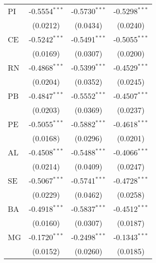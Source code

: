 \begin{tabular}{lccc}
   PI                              & -0.5554$^{***}$              & -0.5730$^{***}$        & -0.5298$^{***}$\\   
                                   & (0.0212)                     & (0.0434)               & (0.0240)\\   
   CE                              & -0.5242$^{***}$              & -0.5491$^{***}$        & -0.5055$^{***}$\\   
                                   & (0.0169)                     & (0.0307)               & (0.0200)\\   
   RN                              & -0.4868$^{***}$              & -0.5399$^{***}$        & -0.4529$^{***}$\\   
                                   & (0.0204)                     & (0.0352)               & (0.0245)\\   
   PB                              & -0.4847$^{***}$              & -0.5552$^{***}$        & -0.4507$^{***}$\\   
                                   & (0.0203)                     & (0.0369)               & (0.0237)\\   
   PE                              & -0.5055$^{***}$              & -0.5882$^{***}$        & -0.4618$^{***}$\\   
                                   & (0.0168)                     & (0.0296)               & (0.0201)\\   
   AL                              & -0.4508$^{***}$              & -0.5488$^{***}$        & -0.4066$^{***}$\\   
                                   & (0.0214)                     & (0.0409)               & (0.0247)\\   
   SE                              & -0.5067$^{***}$              & -0.5741$^{***}$        & -0.4728$^{***}$\\   
                                   & (0.0229)                     & (0.0462)               & (0.0258)\\   
   BA                              & -0.4918$^{***}$              & -0.5837$^{***}$        & -0.4512$^{***}$\\   
                                   & (0.0160)                     & (0.0307)               & (0.0187)\\   
   MG                              & -0.1720$^{***}$              & -0.2498$^{***}$        & -0.1343$^{***}$\\   
                                   & (0.0152)                     & (0.0260)               & (0.0185)\\   

\end{tabular}
